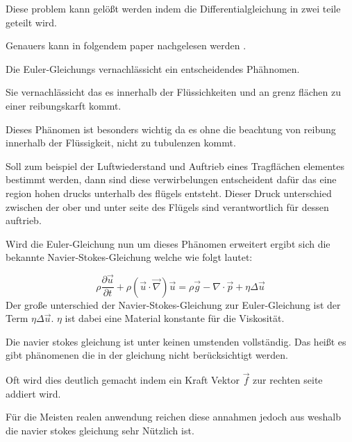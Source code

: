 Diese problem kann gelößt werden indem die Differentialgleichung in zwei teile geteilt wird.

Genauers kann in folgendem paper nachgelesen werden \cite{}.

Die Euler-Gleichungs vernachlässicht ein entscheidendes Phähnomen.

Sie vernachlässicht das es innerhalb der Flüssichkeiten und an grenz flächen zu einer reibungskarft kommt.


Dieses Phänomen ist besonders wichtig da es ohne die beachtung von reibung innerhalb der Flüssigkeit,
nicht zu tubulenzen kommt.

Soll zum beispiel der Luftwiederstand und Auftrieb eines Tragflächen elementes bestimmt werden,
dann sind diese verwirbelungen entscheident dafür das eine region hohen drucks unterhalb des flügels entsteht.
Dieser Druck unterschied zwischen der ober und unter seite des Flügels sind verantwortlich für dessen auftrieb.

Wird die Euler-Gleichung nun um dieses Phänomen erweitert ergibt sich die bekannte Navier-Stokes-Gleichung 
welche wie folgt lautet:

$$
\rho \frac{\partial \vec{u}}{\partial t} + \rho (\vec{u} \cdot \vec{\nabla} ) \vec{u} = 
\rho \vec{g} - \nabla \cdot \vec{p} + \eta \Delta \vec{u}
$$
Der große unterschied der Navier-Stokes-Gleichung zur Euler-Gleichung ist der Term $\eta \Delta \vec{u}$.
$\eta$ ist dabei eine Material konstante für die Viskosität.

Die navier stokes gleichung ist unter keinen umstenden vollständig.
Das heißt es gibt phänomenen die in der gleichung nicht berücksichtigt werden.

Oft wird dies deutlich gemacht indem ein Kraft Vektor $\vec{f}$ zur rechten seite addiert wird.

Für die Meisten realen anwendung reichen diese annahmen jedoch aus weshalb die navier stokes gleichung sehr Nützlich ist.








